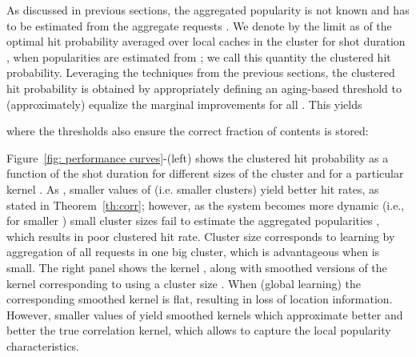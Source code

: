 \documentclass[10pt, conference, letterpaper]{IEEEtran}
\begin{document}
As discussed in previous sections, the aggregated popularity  is not known and has to be estimated from the aggregate requests . We denote by  the limit as  of the optimal hit probability averaged over local caches in the cluster  for shot duration , when popularities are estimated from ; we call this quantity the clustered hit probability. Leveraging the techniques from the previous sections, the clustered hit probability is obtained by appropriately defining an aging-based threshold  to (approximately) equalize the marginal improvements  for all . This yields

where the thresholds  also ensure the correct fraction of contents is stored:

Figure~\ref{fig: performance curves}-(left) shows the clustered hit probability  as a function of the shot duration  for different sizes  of the cluster and for a particular kernel .
As , smaller values of  (i.e. smaller clusters) yield better hit rates, as stated in Theorem~\ref{th:corr}; however, as the system becomes more dynamic (i.e., for smaller ) small cluster sizes fail to estimate the aggregated popularities , which results in poor clustered hit rate.
Cluster size  corresponds to learning by aggregation of all requests in one big cluster, which is advantageous when  is small. 
 The right panel shows the kernel , along with smoothed versions of the kernel  corresponding to using a cluster size . 
When  (global learning) the corresponding smoothed kernel is flat, resulting in loss of location information. 
However, smaller values of  yield smoothed kernels which approximate better and better the true correlation kernel, which allows to capture the local popularity characteristics. 
\end{document}

